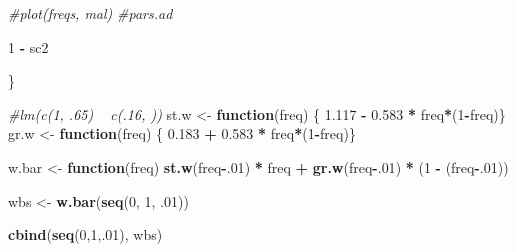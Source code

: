 \documentclass[]{article}
\newenvironment{Shaded}{\begin{snugshade}}{\end{snugshade}}
\newcommand{\KeywordTok}[1]{\textcolor[rgb]{0.13,0.29,0.53}{\textbf{#1}}}
\newcommand{\DecValTok}[1]{\textcolor[rgb]{0.00,0.00,0.81}{#1}}
\newcommand{\FloatTok}[1]{\textcolor[rgb]{0.00,0.00,0.81}{#1}}
\newcommand{\StringTok}[1]{\textcolor[rgb]{0.31,0.60,0.02}{#1}}
\newcommand{\CommentTok}[1]{\textcolor[rgb]{0.56,0.35,0.01}{\textit{#1}}}
\newcommand{\ControlFlowTok}[1]{\textcolor[rgb]{0.13,0.29,0.53}{\textbf{#1}}}
\newcommand{\OperatorTok}[1]{\textcolor[rgb]{0.81,0.36,0.00}{\textbf{#1}}}
\newcommand{\NormalTok}[1]{#1}
\begin{document}
\begin{Shaded}
\begin{Highlighting}[]
  \CommentTok{#plot(freqs, mal)}
  \CommentTok{#pars.ad}

  \DecValTok{1} \OperatorTok{-}\StringTok{ }\NormalTok{sc2}

\NormalTok{\}}


\CommentTok{#lm(c(1, .65) ~ c(.16, ))}
\NormalTok{st.w <-}\StringTok{ }\ControlFlowTok{function}\NormalTok{(freq) \{ }\FloatTok{1.117} \OperatorTok{-}\StringTok{ }\FloatTok{0.583} \OperatorTok{*}\StringTok{ }\NormalTok{freq}\OperatorTok{*}\NormalTok{(}\DecValTok{1}\OperatorTok{-}\NormalTok{freq)\}}
\NormalTok{gr.w <-}\StringTok{ }\ControlFlowTok{function}\NormalTok{(freq) \{ }\FloatTok{0.183} \OperatorTok{+}\StringTok{ }\FloatTok{0.583} \OperatorTok{*}\StringTok{ }\NormalTok{freq}\OperatorTok{*}\NormalTok{(}\DecValTok{1}\OperatorTok{-}\NormalTok{freq)\}}

\NormalTok{w.bar <-}\StringTok{ }\ControlFlowTok{function}\NormalTok{(freq) }\KeywordTok{st.w}\NormalTok{(freq}\OperatorTok{-}\NormalTok{.}\DecValTok{01}\NormalTok{) }\OperatorTok{*}\StringTok{ }\NormalTok{freq }\OperatorTok{+}\StringTok{ }\KeywordTok{gr.w}\NormalTok{(freq}\OperatorTok{-}\NormalTok{.}\DecValTok{01}\NormalTok{) }\OperatorTok{*}\StringTok{ }\NormalTok{(}\DecValTok{1} \OperatorTok{-}\StringTok{ }\NormalTok{(freq}\OperatorTok{-}\NormalTok{.}\DecValTok{01}\NormalTok{))}

\NormalTok{wbs <-}\StringTok{ }\KeywordTok{w.bar}\NormalTok{(}\KeywordTok{seq}\NormalTok{(}\DecValTok{0}\NormalTok{, }\DecValTok{1}\NormalTok{, .}\DecValTok{01}\NormalTok{))}

\KeywordTok{cbind}\NormalTok{(}\KeywordTok{seq}\NormalTok{(}\DecValTok{0}\NormalTok{,}\DecValTok{1}\NormalTok{,.}\DecValTok{01}\NormalTok{), wbs)}
\end{Highlighting}
\end{Shaded}
\end{document}
